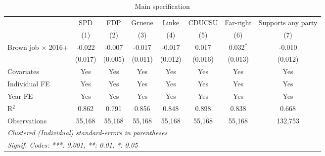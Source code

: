 \begin{table}[htbp]
   \caption{Main specification}
   \centering
   \begin{tabular}{lccccccc}
      \tabularnewline \midrule \midrule
                                & SPD     & FDP     & Gruene  & Linke   & CDUCSU  & Far-right   & Supports any party\\  
                                & (1)     & (2)     & (3)     & (4)     & (5)     & (6)         & (7)\\  
      Brown job $\times$ 2016+  & -0.022  & -0.007  & -0.017  & -0.017  & 0.017   & 0.032$^{*}$ & -0.010\\   
                                & (0.017) & (0.005) & (0.011) & (0.012) & (0.016) & (0.013)     & (0.012)\\   
      Covariates                & Yes     & Yes     & Yes     & Yes     & Yes     & Yes         & Yes\\  
      Individual FE             & Yes     & Yes     & Yes     & Yes     & Yes     & Yes         & Yes\\  
      Year FE                   & Yes     & Yes     & Yes     & Yes     & Yes     & Yes         & Yes\\  
      R$^2$                     & 0.862   & 0.791   & 0.856   & 0.848   & 0.898   & 0.838       & 0.668\\  
      Observations              & 55,168  & 55,168  & 55,168  & 55,168  & 55,168  & 55,168      & 132,753\\  
      \midrule \midrule
      \multicolumn{8}{l}{\emph{Clustered (Individual) standard-errors in parentheses}}\\
      \multicolumn{8}{l}{\emph{Signif. Codes: ***: 0.001, **: 0.01, *: 0.05}}\\
   \end{tabular}
\end{table}


